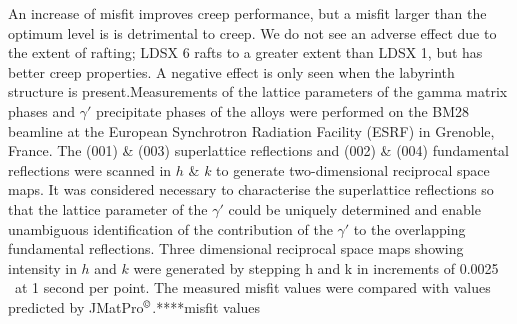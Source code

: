 An increase of misfit improves creep performance, but a misfit larger than the optimum level is is detrimental to creep. We do not see an adverse effect due to the extent of rafting; LDSX 6 rafts to a greater extent than LDSX 1, but has better creep properties. A negative effect is only seen when the labyrinth structure is present.Measurements of the lattice parameters of the gamma matrix phases and $\gamma'$ precipitate phases of the alloys were performed on the BM28 beamline at the European Synchrotron Radiation Facility (ESRF) in Grenoble, France. The (001) \& (003) superlattice reflections and (002) \& (004) fundamental reflections were scanned in $h$ \& $k$ to generate two-dimensional reciprocal space maps. It was considered necessary to characterise the superlattice reflections so that the lattice parameter of the $\gamma'$ could be uniquely determined and enable unambiguous identification of the contribution of the $\gamma'$ to the overlapping fundamental reflections. Three dimensional reciprocal space maps showing intensity in $h$ and $k$ were generated by stepping h and k in increments of 0.0025 \angstrom\ at 1 second per point. The measured misfit values were compared with values predicted by JMatPro$^{\copyright}$.****misfit values

